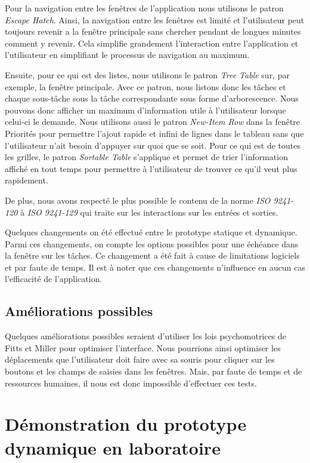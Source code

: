 \documentclass[letterpaper, oneside, 12pt, these, creativecommons]{thETS}
\begin{document}
Pour la navigation entre les fenêtres de l'application nous utilisons le patron \emph{Escape Hatch}. Ainsi, la navigation entre les fenêtres est limité et l'utilisateur peut toujours revenir a la fenêtre principale sans chercher pendant de longues minutes comment y revenir. Cela simplifie grandement l'interaction entre l'application et l'utilisateur en simplifiant le processus de navigation au maximum. 

Ensuite, pour ce qui est des listes, nous utilisons le patron \emph{Tree Table} sur, par exemple, la fenêtre principale. Avec ce patron, nous listons donc les tâches et chaque sous-tâche sous la tâche correspondante sous forme d'arborescence. Nous pouvons donc afficher un maximum d'information utile à l'utilisateur lorsque celui-ci le demande. Nous utilisons aussi le patron \emph{New-Item Row} dans la fenêtre Priorités pour permettre l'ajout rapide et infini de lignes dans le tableau sans que l'utilisateur n'ait besoin d'appuyer sur quoi que se soit. Pour ce qui est de toutes les grilles, le patron \emph{Sortable Table} s'applique et permet de trier l'information affiché en tout temps pour permettre à l'utilisateur de trouver ce qu'il veut plus rapidement. 

De plus, nous avons respecté le plus possible le contenu de la norme \emph{ISO 9241-120} à \emph{ISO 9241-129} qui traite sur les interactions sur les entrées et sorties.

Quelques changements on été effectué entre le prototype statique et dynamique. Parmi ces changements, on compte les options possibles pour une échéance dans la fenêtre sur les tâches. Ce changement a été fait à cause de limitations logiciels et par faute de temps. Il est à noter que ces changements n'influence en aucun cas l'efficacité de l'application.

\section{Améliorations possibles}

Quelques améliorations possibles seraient d'utiliser les lois psychomotrices de Fitts et Miller pour optimiser l'interface. Nous pourrions ainsi optimiser les déplacements que l'utilisateur doit faire avec sa souris pour cliquer sur les boutons et les champs de saisies dans les fenêtres. Mais, par faute de temps et de ressources humaines, il nous est donc impossible d'effectuer ces tests.

\chapter{Démonstration du prototype dynamique en laboratoire}
\end{document}
